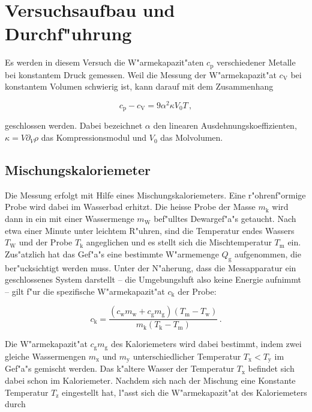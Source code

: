 \section{Versuchsaufbau und Durchf"uhrung} %
\label{sec:durchf_uhrung}
	Es werden in diesem Versuch die W"armekapazit"aten $c_\mathrm{p}$ verschiedener Metalle bei konstantem Druck gemessen.
	Weil die Messung der W"armekapazit"at $c_\mathrm{V}$ bei konstantem Volumen schwierig ist, kann darauf mit dem Zusammenhang

	\begin{equation}
		c_\mathrm{p} - c_\mathrm{V} = 9 \alpha^2 \kappa V_0 T \,,
	\end{equation}

	geschlossen werden.
	Dabei bezeichnet $\alpha$ den linearen Ausdehnungskoeffizienten, $\kappa = V \partial_V \rho$ das Kompressionsmodul und $V_0$ das Molvolumen.

	\subsection{Mischungskaloriemeter}
	\label{subsec:kaloriemeter}
		Die Messung erfolgt mit Hilfe eines Mischungskaloriemeters.
		Eine r"ohrenf"ormige Probe wird dabei im Wasserbad erhitzt.
		Die heisse Probe der Masse $m_\mathrm{k}$ wird dann in ein mit einer Wassermenge $m_\mathrm{W}$ bef"ulltes Dewargef"a"s getaucht.
		Nach etwa einer Minute unter leichtem R"uhren, sind die Temperatur endes Wassers $T_\mathrm{W}$ und der Probe $T_\mathrm{k}$ angeglichen und es stellt sich die Mischtemperatur $T_\mathrm{m}$ ein.
		Zus"atzlich hat das Gef"a"s eine bestimmte W"armemenge $Q_\mathrm{g}$ aufgenommen, die ber"ucksichtigt werden muss.
		Unter der N"aherung, dass die Messapparatur ein geschlossenes System darstellt -- die Umgebungsluft also keine Energie aufnimmt -- gilt f"ur die spezifische W"armekapazit"at $c_\mathrm{k}$ der Probe:

		\begin{equation}
			c_\mathrm{k} = \frac{\left(c_\mathrm{w}m_\mathrm{w} + c_\mathrm{g}m_\mathrm{g}\right)\left(T_\mathrm{m} - T_\mathrm{w} \right)}{m_\mathrm{k} \left(T_\mathrm{k} - T_\mathrm{m} \right)} \,. \label{ck}
		\end{equation}

		Die W"armekapazit"at $c_\mathrm{g}m_\mathrm{g}$ des Kaloriemeters wird dabei bestimmt, indem zwei gleiche Wassermengen $m_\mathrm{x}$ und $m_\mathrm{y}$ unterschiedlicher Temperatur $T_\mathrm{x} < T_\mathrm{y}$ im Gef"a"s gemischt werden.
		Das k"altere Wasser der Temperatur $T_\mathrm{x}$ befindet sich dabei schon im Kaloriemeter.
		Nachdem sich nach der Mischung eine Konstante Temperatur $T_\mathrm{z}$ eingestellt hat, l"asst sich die W"armekapazit"at des Kaloriemeters durch

